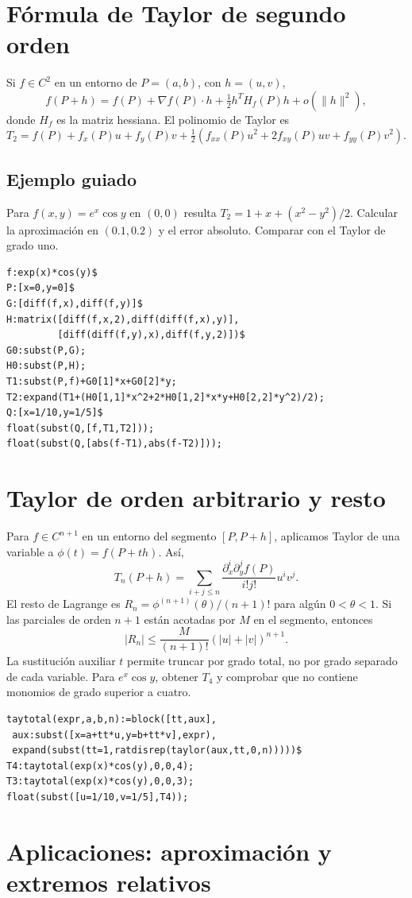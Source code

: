 \documentclass[12pt,a4paper]{article}
\begin{document}
\section{Fórmula de Taylor de segundo orden}
Si $f\in C^2$ en un entorno de $P=(a,b)$, con $h=(u,v)$,
\[f(P+h)=f(P)+\nabla f(P)\cdot h+\tfrac12 h^T H_f(P)h+o(\|h\|^2),\]
 donde $H_f$ es la matriz hessiana. El polinomio de Taylor es
\[\boxed{T_2=f(P)+f_x(P)u+f_y(P)v+\tfrac12(f_{xx}(P)u^2+2f_{xy}(P)uv+f_{yy}(P)v^2).}\]
\subsection*{Ejemplo guiado} Para $f(x,y)=e^x\cos y$ en $(0,0)$ resulta $T_2=1+x+(x^2-y^2)/2$. Calcular la aproximación en $(0.1,0.2)$ y el error absoluto. Comparar con el Taylor de grado uno.
\begin{lstlisting}
f:exp(x)*cos(y)$
P:[x=0,y=0]$
G:[diff(f,x),diff(f,y)]$
H:matrix([diff(f,x,2),diff(diff(f,x),y)],
         [diff(diff(f,y),x),diff(f,y,2)])$
G0:subst(P,G);
H0:subst(P,H);
T1:subst(P,f)+G0[1]*x+G0[2]*y;
T2:expand(T1+(H0[1,1]*x^2+2*H0[1,2]*x*y+H0[2,2]*y^2)/2);
Q:[x=1/10,y=1/5]$
float(subst(Q,[f,T1,T2]));
float(subst(Q,[abs(f-T1),abs(f-T2)]));
\end{lstlisting}
\section{Taylor de orden arbitrario y resto}
Para $f\in C^{n+1}$ en un entorno del segmento $[P,P+h]$, aplicamos Taylor de una variable a $\phi(t)=f(P+th)$. Así,
\[T_n(P+h)=\sum_{i+j\le n}\frac{\partial_x^i\partial_y^j f(P)}{i!j!}u^iv^j.\]
El resto de Lagrange es $R_n=\phi^{(n+1)}(\theta)/(n+1)!$ para algún $0<\theta<1$. Si las parciales de orden $n+1$ están acotadas por $M$ en el segmento, entonces
\[|R_n|\le\frac{M}{(n+1)!}(|u|+|v|)^{n+1}.\]
La sustitución auxiliar $t$ permite truncar por grado total, no por grado separado de cada variable. Para $e^x\cos y$, obtener $T_4$ y comprobar que no contiene monomios de grado superior a cuatro.
\begin{lstlisting}
taytotal(expr,a,b,n):=block([tt,aux],
 aux:subst([x=a+tt*u,y=b+tt*v],expr),
 expand(subst(tt=1,ratdisrep(taylor(aux,tt,0,n)))))$
T4:taytotal(exp(x)*cos(y),0,0,4);
T3:taytotal(exp(x)*cos(y),0,0,3);
float(subst([u=1/10,v=1/5],T4));
\end{lstlisting}
\section{Aplicaciones: aproximación y extremos relativos}
\end{document}
